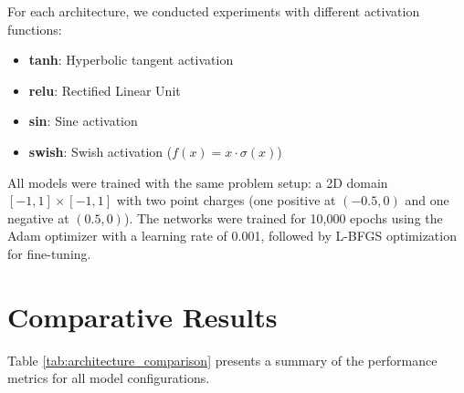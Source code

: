 \documentclass[12pt,a4paper]{report}
\begin{document}
	For each architecture, we conducted experiments with different activation functions:
	\begin{itemize}
		\item \textbf{tanh}: Hyperbolic tangent activation
		\item \textbf{relu}: Rectified Linear Unit 
		\item \textbf{sin}: Sine activation
		\item \textbf{swish}: Swish activation ($f(x) = x \cdot \sigma(x)$)
	\end{itemize}
	
	All models were trained with the same problem setup: a 2D domain $[-1,1] \times [-1,1]$ with two point charges (one positive at $(-0.5, 0)$ and one negative at $(0.5, 0)$). The networks were trained for 10,000 epochs using the Adam optimizer with a learning rate of 0.001, followed by L-BFGS optimization for fine-tuning.
	
	\section{Comparative Results}
	
	Table \ref{tab:architecture_comparison} presents a summary of the performance metrics for all model configurations.
	
	\begin{table}[H]
		\centering
		\caption{Comparison of Different PINN Architectures and Activation Functions}
		\label{tab:architecture_comparison}
	\end{table}
	
\end{document}
